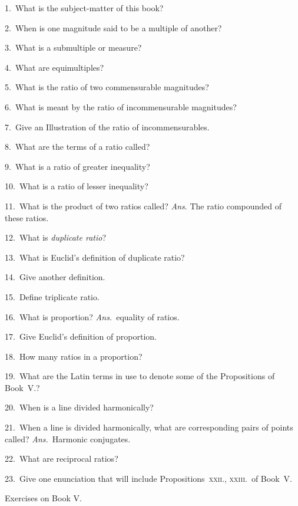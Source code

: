 \documentclass[oneside]{book}
\newcommand\exhead[1]{
\Needspace*{5\baselineskip}\begin{center}
\textsf{#1}
\end{center}
}
\begin{document}
\begin{footnotesize}
1.~What is the subject-matter of this book?

2.~When is one magnitude said to be a multiple of another?

3.~What is a submultiple or measure?

4.~What are equimultiples?

5.~What is the ratio of two commensurable magnitudes?

6.~What is meant by the ratio of incommensurable magnitudes?

7.~Give an Illustration of the ratio of incommensurables.

8.~What are the terms of a ratio called?

9.~What is a ratio of greater inequality?

10.~What is a ratio of lesser inequality?

11.~What is the product of two ratios called? \textit{Ans}. The ratio
compounded of these ratios.


12.~What is \emph{duplicate ratio}?

13.~What is Euclid's definition of duplicate ratio?

14.~Give another definition.

15.~Define triplicate ratio.

16.~What is proportion?  \emph{Ans.}\ equality of ratios.

17.~Give Euclid's definition of proportion.

18.~How many ratios in a proportion?

19.~What are the Latin terms in use to denote some of the
Propositions of Book~V.?

20.~When is a line divided harmonically?

21.~When a line is divided harmonically, what are corresponding
pairs of points called? \emph{Ans.}\ Harmonic conjugates.

22.~What are reciprocal ratios?

23.~Give one enunciation that will include Propositions~\textsc{xxii.},
\textsc{xxiii.}\ of Book~V.
\par\end{footnotesize}

\exhead{Exercises on Book V.}
\end{document}
